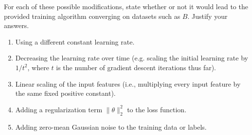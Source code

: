 \item {}
For each of these possible modifications, state whether or not it would lead to
the provided training algorithm converging on datasets such as $B$. Justify your
answers.
\begin{enumerate}
  \item Using a different constant learning rate.
  \item Decreasing the learning rate over time (e.g. scaling the initial
  learning rate by $1/t^2$, where $t$ is the number of gradient descent
  iterations thus far).
  \item Linear scaling of the input features (i.e., multiplying every input feature by the same fixed positive constant).
  \item Adding a regularization term $\|\theta\|_2^2$ to the loss function.
  \item Adding zero-mean Gaussian noise to the training data or labels.
\end{enumerate}

